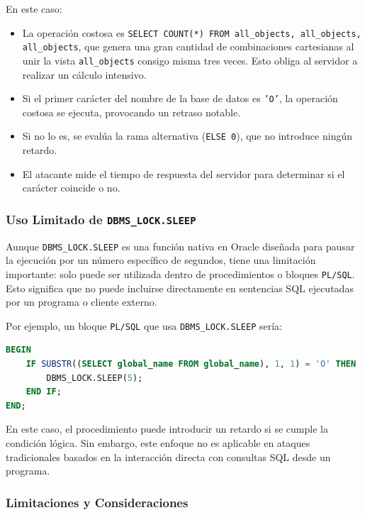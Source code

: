 \documentclass[a4paper,12pt]{article}
\begin{document}
En este caso:
\begin{itemize}
    \item La operación costosa es \texttt{SELECT COUNT(*) FROM all\_objects, all\_objects, all\_objects}, que genera una gran cantidad de combinaciones cartesianas al unir la vista \texttt{all\_objects} consigo misma tres veces. Esto obliga al servidor a realizar un cálculo intensivo.
    \item Si el primer carácter del nombre de la base de datos es \texttt{'O'}, la operación costosa se ejecuta, provocando un retraso notable.
    \item Si no lo es, se evalúa la rama alternativa (\texttt{ELSE 0}), que no introduce ningún retardo.
    \item El atacante mide el tiempo de respuesta del servidor para determinar si el carácter coincide o no.
\end{itemize}

\subsubsection{Uso Limitado de \texttt{DBMS\_LOCK.SLEEP}}

Aunque \texttt{DBMS\_LOCK.SLEEP} es una función nativa en Oracle diseñada para pausar la ejecución por un número específico de segundos, tiene una limitación importante: solo puede ser utilizada dentro de procedimientos o bloques \texttt{PL/SQL}. Esto significa que no puede incluirse directamente en sentencias SQL ejecutadas por un programa o cliente externo.

Por ejemplo, un bloque \texttt{PL/SQL} que usa \texttt{DBMS\_LOCK.SLEEP} sería:

\begin{lstlisting}[language=SQL]
BEGIN
    IF SUBSTR((SELECT global_name FROM global_name), 1, 1) = 'O' THEN
        DBMS_LOCK.SLEEP(5);
    END IF;
END;
\end{lstlisting}

En este caso, el procedimiento puede introducir un retardo si se cumple la condición lógica. Sin embargo, este enfoque no es aplicable en ataques tradicionales basados en la interacción directa con consultas SQL desde un programa.

\subsubsection{Limitaciones y Consideraciones}
\end{document}
